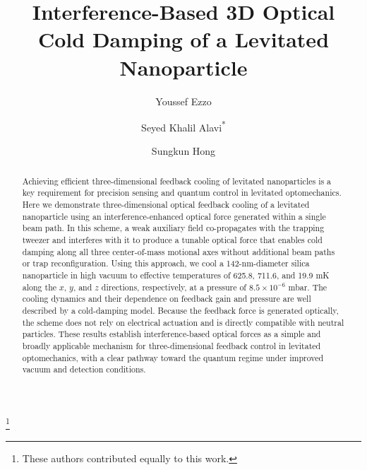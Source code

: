 \documentclass[%
 reprint,
 amsmath,amssymb,
 aps,
prl,
]{revtex4-2}
\begin{document}

%
\title{Interference-Based 3D Optical Cold Damping of a Levitated Nanoparticle}%
%



\author{Youssef Ezzo}
\thanks{These authors contributed equally to this work.}
  
\author{Seyed Khalil Alavi\normalfont\textsuperscript{*}}%




\author{Sungkun Hong}
%



\begin{abstract}
%
Achieving efficient three-dimensional feedback cooling of levitated nanoparticles is a key requirement for precision sensing and quantum control in levitated optomechanics. Here we demonstrate three-dimensional optical feedback cooling of a levitated nanoparticle using an interference-enhanced optical force generated within a single beam path. In this scheme, a weak auxiliary field co-propagates with the trapping tweezer and interferes with it to produce a tunable optical force that enables cold damping along all three center-of-mass motional axes without additional beam paths or trap reconfiguration. Using this approach, we cool a 142-nm-diameter silica nanoparticle in high vacuum to effective temperatures of 625.8, 711.6, and 19.9 mK along the $x$, $y$, and $z$ directions, respectively, at a pressure of $8.5\times10^{-6}$ mbar. The cooling dynamics and their dependence on feedback gain and pressure are well described by a cold-damping model. Because the feedback force is generated optically, the scheme does not rely on electrical actuation and is directly compatible with neutral particles. These results establish interference-based optical forces as a simple and broadly applicable mechanism for three-dimensional feedback control in levitated optomechanics, with a clear pathway toward the quantum regime under improved vacuum and detection conditions.
\end{abstract}
\end{document}

